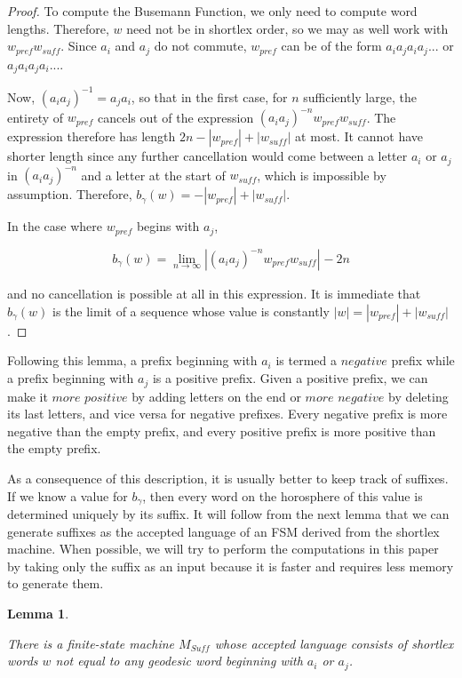 \documentclass{amsart}
\newtheorem{lemma}[theorem]{Lemma}
\theoremstyle{definition}
\theoremstyle{remark}
\begin{document}
	\begin{proof}
		
		To compute the Busemann Function, we only need to compute word lengths. Therefore, $w$ need not be in shortlex order, so we may as well work with $w_{pref}w_{suff}$.	Since $a_i$ and $a_j$ do not commute, $w_{pref}$ can be of the form $a_ia_ja_ia_j...$ or $a_ja_ia_ja_i...$.
		
		Now, $(a_ia_j)^{-1}=a_ja_i$, so that in the first case, for $n$ sufficiently large, the entirety of $w_{pref}$ cancels out of the expression $(a_ia_j)^{-n}w_{pref}w_{suff}$. The expression therefore has length \newline $2n-|w_{pref}|+|w_{suff}|$ at most. It cannot have shorter length since any further cancellation would come between a letter $a_i$ or $a_j$ in $(a_ia_j)^{-n}$ and a letter at the start of $w_{suff}$, which is impossible by assumption. Therefore, $b_\gamma(w)=-|w_{pref}|+|w_{suff}|$.
				
		In the case where $w_{pref}$ begins with $a_j$, 
		
		$$b_\gamma(w)=\lim_{n\to\infty} |(a_ia_j)^{-n}w_{pref}w_{suff}|_{\phantom{ }}-2n$$
		
		and no cancellation is possible at all in this expression. It is immediate that $b_\gamma(w)$ is the limit of a sequence whose value is constantly $|w|=|w_{pref}|+|w_{suff}|$. 		
	\end{proof}
	
	Following this lemma, a prefix beginning with $a_i$ is termed a $\textit{negative}$ prefix while a prefix beginning with $a_j$ is a positive prefix. Given a positive prefix, we can make it $\textit{more positive}$ by adding letters on the end or $\textit{more negative}$ by deleting its last letters, and vice versa for negative prefixes. Every negative prefix is more negative than the empty prefix, and every positive prefix is more positive than the empty prefix.
	
	As a consequence of this description, it is usually better to keep track of suffixes. If we know a value for $b_\gamma$, then every word on the horosphere of this value is determined uniquely by its suffix. It will follow from the next lemma that we can generate suffixes as the accepted language of an FSM derived from the shortlex machine. When possible, we will try to perform the computations in this paper by taking only the suffix as an input because it is faster and requires less memory to generate them.
	
	\begin{lemma}\label{ShortlexSuffixMachine}
		
		There is a finite-state machine $M_{Suff}$ whose accepted language consists of shortlex words $w$ not equal to any geodesic word beginning with $a_i$ or $a_j$.
		
	\end{lemma}
	
\end{document}
